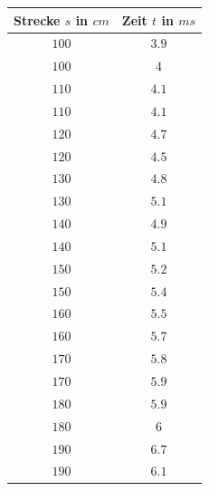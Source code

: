 \begin{center}
\begin{tabular}{c|c}
Strecke \(s\) in \(cm\) & Zeit \(t\) in \(ms\) \\\hline
\(100\) & \( 3.9\) \\ 
\(100\) & \( 4\) \\ 
\(110\) & \( 4.1\) \\ 
\(110\) & \( 4.1\) \\ 
\(120\) & \( 4.7\) \\ 
\(120\) & \( 4.5\) \\ 
\(130\) & \( 4.8\) \\ 
\(130\) & \( 5.1\) \\ 
\(140\) & \( 4.9\) \\ 
\(140\) & \( 5.1\) \\ 
\(150\) & \( 5.2\) \\ 
\(150\) & \( 5.4\) \\ 
\(160\) & \( 5.5\) \\ 
\(160\) & \( 5.7\) \\ 
\(170\) & \( 5.8\) \\ 
\(170\) & \( 5.9\) \\ 
\(180\) & \( 5.9\) \\ 
\(180\) & \( 6\) \\ 
\(190\) & \( 6.7\) \\ 
\(190\) & \( 6.1\) \\
\end{tabular}
\end{center}
